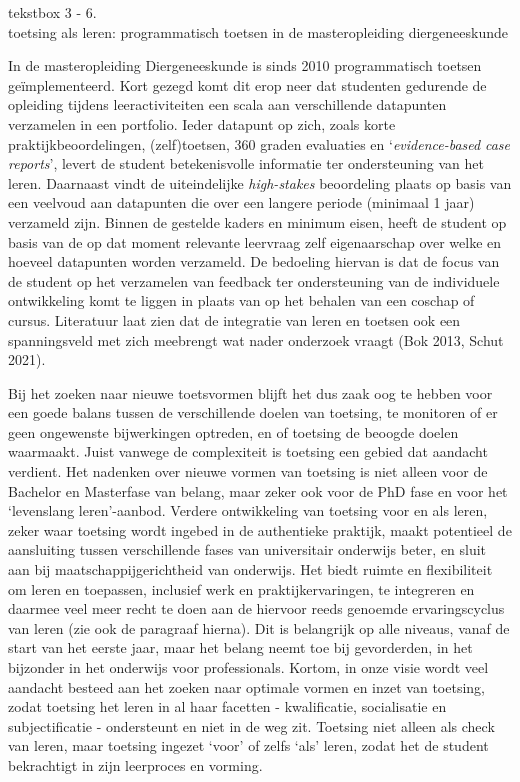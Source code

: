 \documentclass{jote-book}
\begin{document}
	\begin{bookbox}{\raggedright tekstbox 3 - 6. \\toetsing als leren: programmatisch toetsen in de masteropleiding diergeneeskunde}
		In de masteropleiding Diergeneeskunde is sinds 2010 programmatisch toetsen geïmplementeerd. Kort gezegd komt dit erop neer dat studenten gedurende de opleiding tijdens leeractiviteiten een scala aan verschillende datapunten verzamelen in een portfolio. Ieder datapunt op zich, zoals korte praktijkbeoordelingen, (zelf)toetsen, 360 graden evaluaties en ‘\emph{evidence-based}\emph{ case }\emph{reports}', levert de student betekenisvolle informatie ter ondersteuning van het leren. Daarnaast vindt de uiteindelijke \emph{high-}\emph{stakes} beoordeling plaats op basis van een veelvoud aan datapunten die over een langere periode (minimaal 1 jaar) verzameld zijn. Binnen de gestelde kaders en minimum eisen, heeft de student op basis van de op dat moment relevante leervraag zelf eigenaarschap over welke en hoeveel datapunten worden verzameld. De bedoeling hiervan is dat de focus van de student op het verzamelen van feedback ter ondersteuning van de individuele ontwikkeling komt te liggen in plaats van op het behalen van een coschap of cursus. Literatuur laat zien dat de integratie van leren en toetsen ook een spanningsveld met zich meebrengt wat nader onderzoek vraagt (Bok 2013, Schut 2021).\emph{ }
	\end{bookbox}

	Bij het zoeken naar nieuwe toetsvormen blijft het dus zaak oog te hebben voor een goede balans tussen de verschillende doelen van toetsing, te monitoren of er geen ongewenste bijwerkingen optreden, en of toetsing de beoogde doelen waarmaakt. Juist vanwege de complexiteit is toetsing een gebied dat aandacht verdient. Het nadenken over nieuwe vormen van toetsing is niet alleen voor de Bachelor en Masterfase van belang, maar zeker ook voor de PhD fase en voor het ‘levenslang leren'-aanbod. Verdere ontwikkeling van toetsing voor en als leren, zeker waar toetsing wordt ingebed in de authentieke praktijk, maakt potentieel de aansluiting tussen verschillende fases van universitair onderwijs beter, en sluit aan bij maatschappijgerichtheid van onderwijs. Het biedt ruimte en flexibiliteit om leren en toepassen, inclusief werk en praktijkervaringen, te integreren en daarmee veel meer recht te doen aan de hiervoor reeds genoemde ervaringscyclus van leren (zie ook de paragraaf hierna). Dit is belangrijk op alle niveaus, vanaf de start van het eerste jaar, maar het belang neemt toe bij gevorderden, in het bijzonder in het onderwijs voor professionals. Kortom, in onze visie wordt veel aandacht besteed aan het zoeken naar optimale vormen en inzet van toetsing, zodat toetsing het leren in al haar facetten - kwalificatie, socialisatie en subjectificatie - ondersteunt en niet in de weg zit. Toetsing niet alleen als check van leren, maar toetsing ingezet ‘voor' of zelfs ‘als' leren, zodat het de student bekrachtigt in zijn leerproces en vorming.
\end{document}
